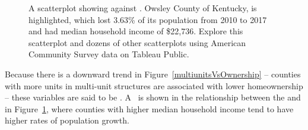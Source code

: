 


\begin{figure}
  \centering
{}
  \caption{A scatterplot showing
      against .
      Owsley County of Kentucky, is highlighted,
      which lost 3.63\% of its population from 2010 to 2017
      and had median household income of \$22,736.  Explore this scatterplot and dozens of other scatterplots using American Community Survey data on Tableau Public.}
  \label{pop_change_v_med_income}
\end{figure}

Because there is a downward trend in
Figure~\ref{multiunitsVsOwnership} --
counties with more units in multi-unit structures
are associated with lower homeownership --
these variables are said to be
.
A~ is shown in the relationship
between the
and 
in Figure~\ref{pop_change_v_med_income},
where counties with higher median household income tend
to have higher rates of population growth.

